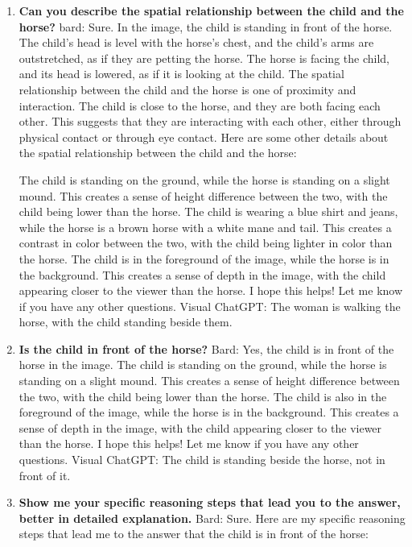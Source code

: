     \begin{enumerate}
        \item \textbf{Can you describe the spatial relationship between the child and the horse?}
        \subitem bard: 
        Sure. In the image, the child is standing in front of the horse. The child's head is level with the horse's chest, and the child's arms are outstretched, as if they are petting the horse. The horse is facing the child, and its head is lowered, as if it is looking at the child. The spatial relationship between the child and the horse is one of proximity and interaction. The child is close to the horse, and they are both facing each other. This suggests that they are interacting with each other, either through physical contact or through eye contact.
        Here are some other details about the spatial relationship between the child and the horse:

        The child is standing on the ground, while the horse is standing on a slight mound. This creates a sense of height difference between the two, with the child being lower than the horse.
        The child is wearing a blue shirt and jeans, while the horse is a brown horse with a white mane and tail. This creates a contrast in color between the two, with the child being lighter in color than the horse.
        The child is in the foreground of the image, while the horse is in the background. This creates a sense of depth in the image, with the child appearing closer to the viewer than the horse.
        I hope this helps! Let me know if you have any other questions.
        \subitem Visual ChatGPT: The woman is walking the horse, with the child standing beside them.
        \item \textbf{Is the child in front of the horse?}
        \subitem Bard: Yes, the child is in front of the horse in the image. The child is standing on the ground, while the horse is standing on a slight mound. This creates a sense of height difference between the two, with the child being lower than the horse. The child is also in the foreground of the image, while the horse is in the background. This creates a sense of depth in the image, with the child appearing closer to the viewer than the horse.
        I hope this helps! Let me know if you have any other questions.
        \subitem Visual ChatGPT: The child is standing beside the horse, not in front of it.
        \item \textbf{Show me your specific reasoning steps that lead you to the answer, better in detailed explanation.}
        \subitem Bard: Sure. Here are my specific reasoning steps that lead me to the answer that the child is in front of the horse:


\end{enumerate}
